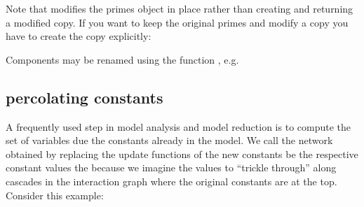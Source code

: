 \documentclass[letterpaper,10pt,english]{sphinxmanual}
\begin{document}
Note that  modifies the primes object in place rather than creating and returning a modified copy.
If you want to keep the original primes and modify a copy you have to create the copy explicitly:

\begin{sphinxVerbatim}[commandchars=\\\{\}]
  
 
\end{sphinxVerbatim}

Components may be renamed using the function {\hyperref[\detokenize{PrimeImplicants:rename-variable}]{}}, e.g.

\begin{sphinxVerbatim}[commandchars=\\\{\}]
  
\end{sphinxVerbatim}


\subsection{percolating constants}
\label{\detokenize{Manual:percolating-constants}}
A frequently used step in model analysis and model reduction is to compute the set of variables  due the constants already in the model.
We call the network obtained by replacing the update functions of the new constants be the respective constant values the 
because we imagine the values to “trickle through” along cascades in the interaction graph where the original constants are at the top.
Consider this example:

\begin{sphinxVerbatim}[commandchars=\\\{\}]
  
\end{sphinxVerbatim}
\end{document}
